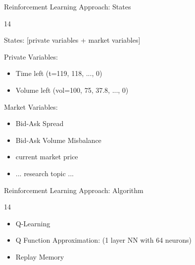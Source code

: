\documentclass[10pt]{beamer}
\begin{document}
\begin{frame}[fragile]{Reinforcement Learning Approach: States}
\begin{overlayarea}{\textwidth}{14\baselineskip}


States:  [private variables + market variables]
\vspace{2mm}

\vspace{2mm}

Private Variables:
\begin{itemize}
\item Time left (t=119, 118, ..., 0)
\item Volume left (vol=100, 75, 37.8, ..., 0)
\end{itemize}

Market Variables:
\begin{itemize}
\item Bid-Ask Spread
\item Bid-Ask Volume Misbalance
\item current market price
\item ... research topic ...
\end{itemize}

\end{overlayarea}
\end{frame}

\begin{frame}[fragile]{Reinforcement Learning Approach: Algorithm}
\begin{overlayarea}{\textwidth}{14\baselineskip}

\begin{itemize}
\item Q-Learning
\item Q Function Approximation: (1 layer NN with 64 neurons)
\item Replay Memory
\end{itemize}

\end{overlayarea}
\end{frame}
\end{document}
